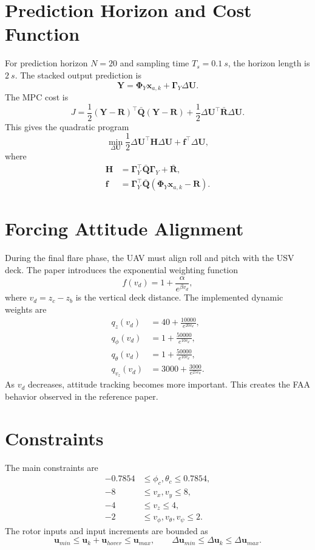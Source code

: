 \documentclass[12pt,a4paper]{report}
\begin{document}
\section{Prediction Horizon and Cost Function}
For prediction horizon $N=20$ and sampling time $T_s=\SI{0.1}{s}$, the horizon length is $\SI{2}{s}$. The stacked output prediction is
\begin{equation}
\bm{Y}=\bm{\Phi}_Y\bm{x}_{a,k}+\bm{\Gamma}_Y\Delta\bm{U}.
\end{equation}
The MPC cost is
\begin{equation}
J=
\frac{1}{2}(\bm{Y}-\bm{R})^{\top}\bar{\bm{Q}}(\bm{Y}-\bm{R})
+\frac{1}{2}\Delta\bm{U}^{\top}\bar{\bm{R}}\Delta\bm{U}.
\end{equation}
This gives the quadratic program
\begin{equation}
\min_{\Delta\bm{U}}
\frac{1}{2}\Delta\bm{U}^{\top}\bm{H}\Delta\bm{U}
+\bm{f}^{\top}\Delta\bm{U},
\end{equation}
where
\begin{align}
\bm{H}&=\bm{\Gamma}_Y^{\top}\bar{\bm{Q}}\bm{\Gamma}_Y+\bar{\bm{R}},\\
\bm{f}&=\bm{\Gamma}_Y^{\top}\bar{\bm{Q}}(\bm{\Phi}_Y\bm{x}_{a,k}-\bm{R}).
\end{align}

\section{Forcing Attitude Alignment}
During the final flare phase, the UAV must align roll and pitch with the USV deck. The paper introduces the exponential weighting function
\begin{equation}
f(v_d)=1+\frac{\alpha}{e^{\beta v_d}},
\end{equation}
where $v_d=z_c-z_b$ is the vertical deck distance. The implemented dynamic weights are
\begin{align}
q_z(v_d)&=40+\frac{10000}{e^{20v_d}},\\
q_\phi(v_d)&=1+\frac{50000}{e^{10v_d}},\\
q_\theta(v_d)&=1+\frac{50000}{e^{10v_d}},\\
q_{v_z}(v_d)&=3000+\frac{3000}{e^{25v_d}}.
\end{align}
As $v_d$ decreases, attitude tracking becomes more important. This creates the FAA behavior observed in the reference paper.

\section{Constraints}
The main constraints are
\begin{align}
-0.7854 &\leq \phi_c,\theta_c \leq 0.7854,\\
-8 &\leq v_x,v_y \leq 8,\\
-4 &\leq v_z \leq 4,\\
-2 &\leq v_\phi,v_\theta,v_\psi \leq 2.
\end{align}
The rotor inputs and input increments are bounded as
\begin{equation}
\bm{u}_{min}\leq \bm{u}_k+\bm{u}_{hover}\leq \bm{u}_{max},
\qquad
\Delta\bm{u}_{min}\leq \Delta\bm{u}_k\leq \Delta\bm{u}_{max}.
\end{equation}
\end{document}
